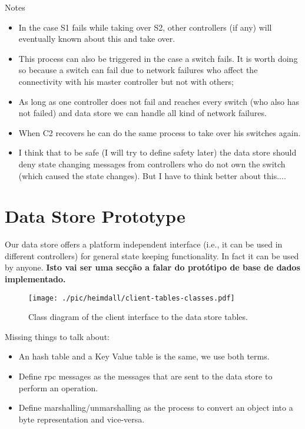 Notes
\begin{itemize}
\item In the case S1 fails while taking over S2, other controllers (if any) will eventually known about this and take over. 
\item This process can also be triggered in the case a switch fails. It is worth doing so because a switch can fail due to network failures who affect the connectivity with his master controller but not with others; 
\item As long as one  controller does not fail and reaches every switch (who also has not failed)  and data store we can handle all kind of network failures.
\item When C2 recovers he can do the same process to take over his switches again. 
\item I think that to be safe (I will try to define safety later) the data store should deny state changing messages from controllers who do not own the switch (which caused the state changes). But I have to think better about this.... 
\end{itemize}



\section{Data Store Prototype}
\glsresetall 
Our data store offers a platform independent interface (i.e., it can be used in different controllers) for general state keeping functionality. In fact it can be used by anyone. 
\textbf{Isto vai ser uma secção a falar do protótipo de base de dados implementado.} 
\begin{figure}[ht]
  \centering
  \texttt{[image: ./pic/heimdall/client-tables-classes.pdf]}
  \caption{Class diagram of the client interface to the data store tables.}
\label{fig:design:class-diagram}
\end{figure}

Missing things to talk about: 
\begin{itemize}
\item An hash table and a Key Value table is the same, we use both terms. 
\item Define \gls{rpc} messages as the messages that are sent to the data store to perform an operation. 
\item Define marshalling/unmarshalling as the process to convert an object into a byte representation and vice-versa. 
\end{itemize}

